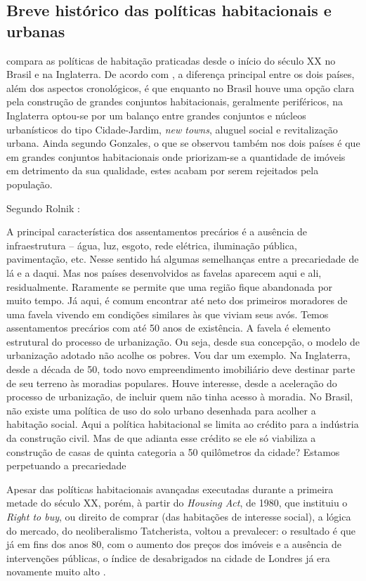 \documentclass[
	12pt,				%
	oneside,			%
	a4paper,			%
	chapter=TITLE,		%
	section=TITLE,		%
	english,			%
	brazil				%
	]{abntex2}
\begin{document}
\begin{refsection}
{\section{Breve histórico das políticas habitacionais e urbanas}\label{breve-histuxf3rico-das-poluxedticas-habitacionais-e-urbanas}}

\textcite{jung2018} compara as políticas de habitação praticadas desde o início do século
XX no Brasil e na Inglaterra. De acordo com \textcite[p.~165]{jung2018}, a diferença
principal entre os dois países, além dos aspectos cronológicos, é que enquanto
no Brasil houve uma opção clara pela construção de grandes conjuntos
habitacionais, geralmente periféricos, na Inglaterra optou-se por um balanço
entre grandes conjuntos e núcleos urbanísticos do tipo Cidade-Jardim, \emph{new
towns}, aluguel social e revitalização urbana. Ainda segundo Gonzales, o que
se observou também nos dois países é que em grandes conjuntos habitacionais
onde priorizam-se a quantidade de imóveis em detrimento da sua qualidade,
estes acabam por serem rejeitados pela população.

Segundo Rolnik \autocite[\emph{apud}][165-166]{jung2018}:
\begin{citacao}
A principal característica dos assentamentos precários é a ausência de
infraestrutura – água, luz, esgoto, rede elétrica, iluminação pública,
pavimentação, etc. Nesse sentido há algumas semelhanças entre a precariedade de
lá e a daqui. Mas nos países desenvolvidos as favelas aparecem aqui e ali,
residualmente. Raramente se permite que uma região fique abandonada por muito
tempo. Já aqui, é comum encontrar até neto dos primeiros moradores de uma favela
vivendo em condições similares às que viviam seus avós. Temos assentamentos
precários com até 50 anos de existência. A favela é elemento estrutural do
processo de urbanização. Ou seja, desde sua concepção, o modelo de urbanização
adotado não acolhe os pobres. Vou dar um exemplo. Na Inglaterra, desde a década
de 50, todo novo empreendimento imobiliário deve destinar parte de seu terreno
às moradias populares. Houve interesse, desde a aceleração do processo de
urbanização, de incluir quem não tinha acesso à moradia. No Brasil, não existe
uma política de uso do solo urbano desenhada para acolher a habitação social.
Aqui a política habitacional se limita ao crédito para a indústria da construção
civil. Mas de que adianta esse crédito se ele só viabiliza a construção de casas
de quinta categoria a 50 quilômetros da cidade? Estamos perpetuando a
precariedade
\end{citacao}
Apesar das políticas habitacionais avançadas executadas durante a primeira
metade do século XX, porém, à partir do \emph{Housing Act}, de 1980, que instituiu o
\emph{Right to buy}, ou direito de comprar (das habitações de interesse social), a
lógica do mercado, do neoliberalismo Tatcherista, voltou a prevalecer: o
resultado é que já em fins dos anos 80, com o aumento dos preços dos imóveis e a
ausência de intervenções públicas, o índice de desabrigados na cidade de Londres
já era novamente muito alto \autocite[72]{jung2018}.


\end{refsection}
\end{document}
